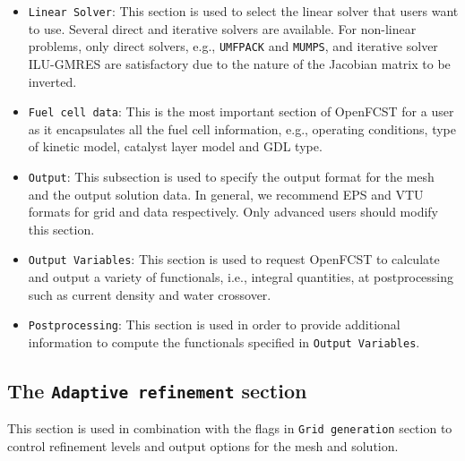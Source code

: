 \begin{itemize}
 \item \texttt{Linear Solver}: This section is used to select the linear solver that users want to use. Several direct and iterative solvers are available. For non-linear problems, only direct solvers, e.g., \texttt{UMFPACK} and \texttt{MUMPS}, and iterative solver ILU-GMRES are satisfactory due to the nature of the Jacobian matrix to be inverted. 
 \item \texttt{Fuel cell data}: This is the most important section of OpenFCST for a user as it encapsulates all the fuel cell information, e.g., operating conditions, type of kinetic model, catalyst layer model and GDL type.
 \item \texttt{Output}: This subsection is used to specify the output format for the mesh and the output solution data. In general, we recommend EPS and VTU formats for grid and data respectively. Only advanced users should modify this section.
 \item \texttt{Output Variables}: This section is used to request OpenFCST to calculate and output a variety of functionals, i.e., integral quantities, at postprocessing such as current density and water crossover.
 \item \texttt{Postprocessing}: This section is used in order to provide additional information to compute the functionals specified in \texttt{Output Variables}.
\end{itemize}

\subsection{The \texttt{Adaptive refinement} section}

This section is used in combination with the flags in \texttt{Grid generation} section to control refinement levels and output options for the mesh and solution. 

